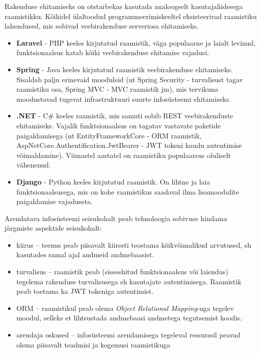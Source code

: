Rakenduse ehitamiseks on otstarbekas kasutada analoogselt kasutajaliidesega raamistikku. Kõikidel ülaltoodud
programmeerimiskeeltel eksisteerivad raamistiku lahendused, mis sobivad veebirakenduse serveriosa ehitamiseks.

\begin{itemize}
    \item \textbf{Laravel} - PHP keeles kirjutatud raamistik, väga populaarne ja laialt levinud, funktsionaalsus 
    katab kõiki veebirakenduse ehitamise vajadusi.
    \item \textbf{Spring} - Java keeles kirjutatud raamistik veebirakenduse ehitamiseks. Sisaldab palju erinevaid 
    mooduleid (nt Spring Security - turvalisust tagav raamistiku osa, Spring MVC - MVC raamistik jm), mis 
    tervikuna moodustavad tugevat infrastruktuuri suurte infosüsteemi ehitamiseks.
    \item \textbf{.NET} - C\# keeles raamistik, mis samuti sobib REST veebirakenduste ehitamiseks. 
    Vajalik funktsionaalsus on tagatav vastavate paketide paigaldamisega (nt EntityFrameworkCore - 
    ORM raamistik, AspNetCore.Authentification.JwtBearer - JWT tokeni kaudu autentimise võimaldamine).
    Viimastel aastatel on raamistiku populaarsus oluliselt vähenenud.
    \item \textbf{Django} - Python keeles kirjutatud raamistik. On lihtne ja laia funktsionaalsusega,
    mis on kohe raamistikus saadaval ilma lisamoodulite paigaldamise vajaduseta.
\end{itemize}

Arendatava infosüsteemi seisukohalt peab tehnoloogia sobivuse hindama järgmiste aspektide seisukohalt: 
\begin{itemize}
    \item kiirus -- teenus peab piisavalt kiiresti teostama kõikvõimalikud arvutused, sh kasutades samal
    ajal andmeid andmebaasist.
    \item turvalisus -- raamistik peab (sisseehitud funktsionaalsus või laiendus) tegelema
    rakenduse turvalisusega sh kasutajate autentimisega. Raamistik peab toetama ka JWT tokeniga
    autentimist.
    \item ORM -- raamistikul peab olema \textit{Object Relational Mapping}-uga tegelev moodul, 
    selleks et lihtsustada andmebaasi andmetega tegutsemist koodis.
    \item arendaja oskused -- infosüsteemi arendamisega tegeleval ressurssil peavad olema piisavalt teadmisi
    ja kogemusi raamistikuga
\end{itemize} 

